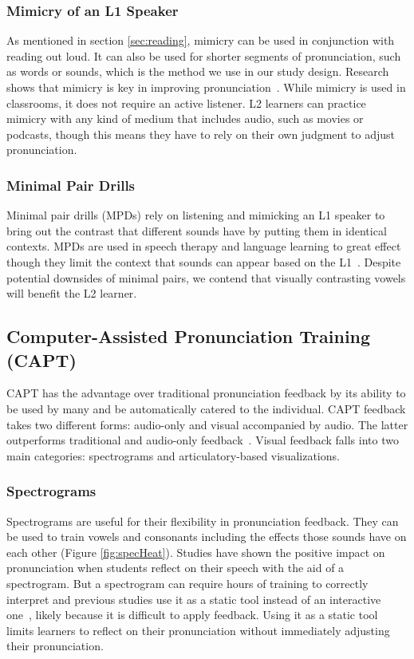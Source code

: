 \subsubsection{Mimicry of an L1 Speaker}
As mentioned in section \ref{sec:reading}, mimicry can be used in conjunction with reading out loud. It can also be used for shorter segments of pronunciation, such as words or sounds, which is the method we use in our study design. Research shows that mimicry is key in improving pronunciation~\cite{hinton_aptitude_2013, szyszka_good_2015}. While mimicry is used in classrooms, it does not require an active listener. L2 learners can practice mimicry with any kind of medium that includes audio, such as movies or podcasts, though this means they have to rely on their own judgment to adjust pronunciation. 

\subsubsection{Minimal Pair Drills}
\label{sec:minimal}
Minimal pair drills (MPDs) rely on listening and mimicking an L1 speaker to bring out the contrast that different sounds have by putting them in identical contexts. MPDs are used in speech therapy and language learning to great effect though they limit the context that sounds can appear based on the L1~\cite{barlow_minimal_2002, hamzah_teaching_2019, rahman_use_2018, brown_minimal_1995}. Despite potential downsides of minimal pairs, we contend that visually contrasting vowels will benefit the L2 learner.   

\subsection{Computer-Assisted Pronunciation Training (CAPT)}
CAPT has the advantage over traditional pronunciation feedback by its ability to be used by many and be automatically catered to the individual. CAPT feedback takes two different forms: audio-only and visual accompanied by audio. The latter outperforms traditional and audio-only feedback~\cite{olson2014benefits,hew_effect_2004}. Visual feedback falls into two main categories: spectrograms and articulatory-based visualizations.

\subsubsection{Spectrograms} 
Spectrograms are useful for their flexibility in pronunciation feedback. They can be used to train vowels and consonants including the effects those sounds have on each other (Figure \ref{fig:specHeat}). Studies have shown the positive impact on pronunciation when students reflect on their speech with the aid of a spectrogram. But a spectrogram can require hours of training to correctly interpret and previous studies use it as a static tool instead of an interactive one~\cite{greene_recognition_1984}, likely because it is difficult to apply feedback. Using it as a static tool limits learners to reflect on their pronunciation without immediately adjusting their pronunciation. 


